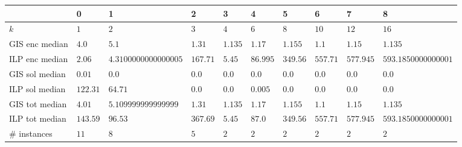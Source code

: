 \begin{tabular}{llllllllll}
\toprule
{} &         0 &                     1 &         2 &        3 &         4 &         5 &         6 &          7 &                    8 \\
\midrule
$k$            &       $1$ &                   $2$ &       $3$ &      $4$ &       $6$ &       $8$ &      $10$ &       $12$ &                 $16$ \\
GIS enc median &     $4.0$ &                 $5.1$ &    $1.31$ &  $1.135$ &    $1.17$ &   $1.155$ &     $1.1$ &     $1.15$ &              $1.135$ \\
ILP enc median &    $2.06$ &  $4.3100000000000005$ &  $167.71$ &   $5.45$ &  $86.995$ &  $349.56$ &  $557.71$ &  $577.945$ &  $593.1850000000001$ \\
GIS sol median &    $0.01$ &                 $0.0$ &     $0.0$ &    $0.0$ &     $0.0$ &     $0.0$ &     $0.0$ &      $0.0$ &                $0.0$ \\
ILP sol median &  $122.31$ &               $64.71$ &     $0.0$ &    $0.0$ &   $0.005$ &     $0.0$ &     $0.0$ &      $0.0$ &                $0.0$ \\
GIS tot median &    $4.01$ &   $5.109999999999999$ &    $1.31$ &  $1.135$ &    $1.17$ &   $1.155$ &     $1.1$ &     $1.15$ &              $1.135$ \\
ILP tot median &  $143.59$ &               $96.53$ &  $367.69$ &   $5.45$ &    $87.0$ &  $349.56$ &  $557.71$ &  $577.945$ &  $593.1850000000001$ \\
\# instances   &      $11$ &                   $8$ &       $5$ &      $2$ &       $2$ &       $2$ &       $2$ &        $2$ &                  $2$ \\
\bottomrule
\end{tabular}

